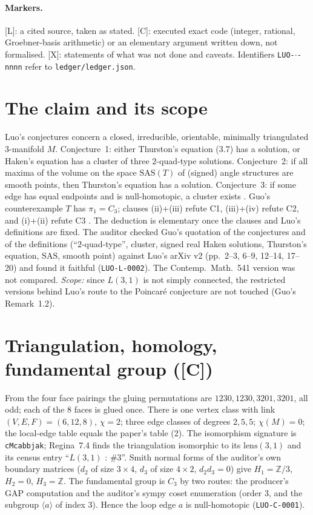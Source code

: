 \documentclass[10pt]{article}
\newcommand{\tier}[1]{\textsf{[#1]}}
\newcommand{\tL}{\tier{L}}
\newcommand{\tC}{\tier{C}}
\newcommand{\tX}{\tier{X}}
\begin{document}
\paragraph{Markers.} \tL{}: a cited source, taken as stated. \tC{}: executed exact code (integer, rational, Groebner-basis arithmetic) or an elementary argument written down, not formalised. \tX{}: statements of what was not done and caveats. Identifiers \texttt{LUO-$\cdot$-nnnn} refer to \texttt{ledger/ledger.json}.

\section{The claim and its scope}\label{sec:claim}
Luo's conjectures concern a closed, irreducible, orientable, minimally triangulated $3$-manifold $M$. Conjecture~1: either Thurston's equation (3.7) has a solution, or Haken's equation has a cluster of three $2$-quad-type solutions. Conjecture~2: if all maxima of the volume on the space $\mathrm{SAS}(T)$ of (signed) angle structures are smooth points, then Thurston's equation has a solution. Conjecture~3: if some edge has equal endpoints and is null-homotopic, a cluster exists \cite{luo}. Guo's counterexample $T$ has $\pi_1=C_3$; clauses (ii)+(iii) refute C1, (iii)+(iv) refute C2, and (i)+(ii) refute C3 \cite{guo}. The deduction is elementary once the clauses and Luo's definitions are fixed. The auditor checked Guo's quotation of the conjectures and of the definitions (``$2$-quad-type'', cluster, signed real Haken solutions, Thurston's equation, $\mathrm{SAS}$, smooth point) against Luo's arXiv v2 (pp.\ 2--3, 6--9, 12--14, 17--20) and found it faithful (\texttt{LUO-L-0002}). The Contemp.\ Math.\ 541 version was not compared. \emph{Scope:} since $L(3,1)$ is not simply connected, the restricted versions behind Luo's route to the Poincar\'e conjecture are not touched (Guo's Remark~1.2).

\section{Triangulation, homology, fundamental group (\tC{})}\label{sec:tri}
From the four face pairings the gluing permutations are $1230,1230,3201,3201$, all odd; each of the $8$ faces is glued once. There is one vertex class with link $(V,E,F)=(6,12,8)$, $\chi=2$; three edge classes of degrees $2,5,5$; $\chi(M)=0$; the local-edge table equals the paper's table (2). The isomorphism signature is \texttt{cMcabbjak}; Regina~7.4 finds the triangulation isomorphic to its $\mathrm{lens}(3,1)$ and its census entry ``$L(3,1)$ : \#3''. Smith normal forms of the auditor's own boundary matrices ($d_2$ of size $3\times4$, $d_3$ of size $4\times2$, $d_2d_3=0$) give $H_1=\mathbb Z/3$, $H_2=0$, $H_3=\mathbb Z$. The fundamental group is $C_3$ by two routes: the producer's GAP computation and the auditor's sympy coset enumeration (order $3$, and the subgroup $\langle a\rangle$ of index $3$). Hence the loop edge $a$ is null-homotopic (\texttt{LUO-C-0001}).
\end{document}

